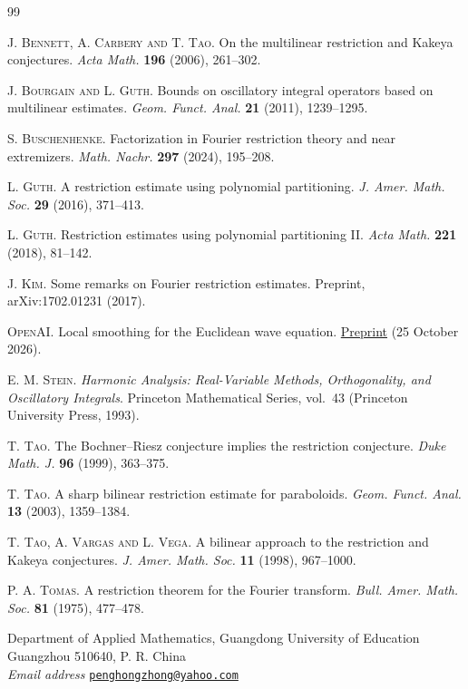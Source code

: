 \documentclass[11pt]{article}
\numberwithin{equation}{section}
\begin{document}
\begin{thebibliography}{99}


\textsc{J. Bennett, A. Carbery and T. Tao}.
On the multilinear restriction and Kakeya conjectures.
\emph{Acta Math.} \textbf{196} (2006), 261--302.

\textsc{J. Bourgain and L. Guth}.
Bounds on oscillatory integral operators based on multilinear estimates.
\emph{Geom. Funct. Anal.} \textbf{21} (2011), 1239--1295.

\textsc{S. Buschenhenke}.
Factorization in Fourier restriction theory and near extremizers.
\emph{Math. Nachr.} \textbf{297} (2024), 195--208.


\textsc{L. Guth}.
A restriction estimate using polynomial partitioning.
\emph{J. Amer. Math. Soc.} \textbf{29} (2016), 371--413.

\textsc{L. Guth}.
Restriction estimates using polynomial partitioning II.
\emph{Acta Math.} \textbf{221} (2018), 81--142.

\textsc{J. Kim}.
Some remarks on Fourier restriction estimates.
Preprint, arXiv:1702.01231 (2017).

\textsc{OpenAI}.
Local smoothing for the Euclidean wave equation.
\href{https://mathcommunity.github.io/oai-math-revised/papers/Local-smoothing-for-the-Euclidean-wave-equation-October-25-2026/paper.pdf}{Preprint} (25 October 2026).

\textsc{E. M. Stein}.
\emph{Harmonic Analysis: Real-Variable Methods, Orthogonality, and Oscillatory Integrals}.
Princeton Mathematical Series, vol.~43 (Princeton University Press, 1993).

\textsc{T. Tao}.
The Bochner--Riesz conjecture implies the restriction conjecture.
\emph{Duke Math. J.} \textbf{96} (1999), 363--375.

\textsc{T. Tao}.
A sharp bilinear restriction estimate for paraboloids.
\emph{Geom. Funct. Anal.} \textbf{13} (2003), 1359--1384.

\textsc{T. Tao, A. Vargas and L. Vega}.
A bilinear approach to the restriction and Kakeya conjectures.
\emph{J. Amer. Math. Soc.} \textbf{11} (1998), 967--1000.

\textsc{P. A. Tomas}.
A restriction theorem for the Fourier transform.
\emph{Bull. Amer. Math. Soc.} \textbf{81} (1975), 477--478.

\end{thebibliography}



\bigskip
\begin{flushleft}
\small
Department of Applied Mathematics, Guangdong University of Education\\
Guangzhou 510640, P. R. China\\[3pt]
\textit{Email address}\quad
\href{mailto:penghongzhong@yahoo.com}{\texttt{penghongzhong@yahoo.com}}
\end{flushleft}
\end{document}

